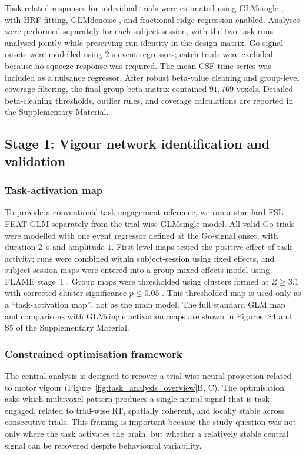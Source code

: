 \documentclass[utf8]{FrontiersinHarvard}
\begin{document}
Task-related responses for individual trials were estimated using GLMsingle \citep{prince2022improving}, with HRF fitting, GLMdenoise \citep{kay2013glmdenoise}, and fractional ridge regression enabled. Analyses were performed separately for each subject-session, with the two task runs analysed jointly while preserving run identity in the design matrix. Go-signal onsets were modelled using \(2\)-s event regressors; catch trials were excluded because no squeeze response was required. The mean CSF time series was included as a nuisance regressor. After robust beta-value cleaning and group-level coverage filtering, the final group beta matrix contained \(91{,}769\) voxels. Detailed beta-cleaning thresholds, outlier rules, and coverage calculations are reported in the Supplementary Material.

\subsection{Stage 1: Vigour network identification and validation}

\subsubsection{Task-activation map}
To provide a conventional task-engagement reference, we ran a standard FSL FEAT GLM separately from the trial-wise GLMsingle model. All valid Go trials were modelled with one event regressor defined at the Go-signal onset, with duration \(2\)~s and amplitude \(1\). First-level maps tested the positive effect of task activity; runs were combined within subject-session using fixed effects, and subject-session maps were entered into a group mixed-effects model using FLAME stage~1 \citep{woolrich2004multilevel,beckmann2003general}. Group maps were thresholded using clusters formed at \(Z \geq 3.1\) with corrected cluster significance \(p \leq 0.05\) \citep{worsley200114}. This thresholded map is used only as a ``task-activation map'', not as the main model. The full standard GLM map and comparisons with GLMsingle activation maps are shown in Figures~S4 and S5 of the Supplementary Material.


\subsubsection{Constrained optimisation framework}
The central analysis is designed to recover a trial-wise neural projection related to motor vigour (Figure~\ref{fig:task_analysis_overview}B, C). The optimisation asks which multivoxel pattern produces a single neural signal that is task-engaged, related to trial-wise RT, spatially coherent, and locally stable across consecutive trials. This framing is important because the study question was not only where the task activates the brain, but whether a relatively stable central signal can be recovered despite behavioural variability.
\end{document}
